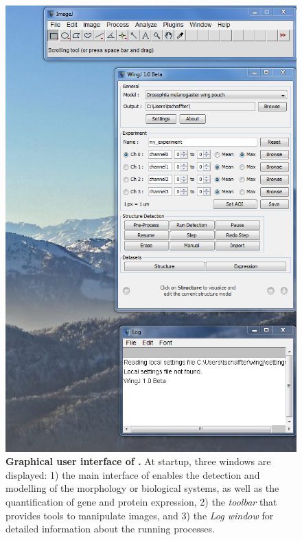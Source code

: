 \begin{figure}[!h]
\centering
\includegraphics[scale=0.5]{images/wingj_interface_crop4.jpg}
\caption{\textbf{Graphical user interface of \wingj.} At startup, three windows are displayed: 1) the main interface of \wingj enables the detection and modelling of the morphology or biological systems, as well as the quantification of gene and protein expression, 2) the \textit{\ij toolbar} that provides tools to manipulate images, and 3) the \textit{Log window} for detailed information about the running processes.}
\label{fig:wingj_interface}
\end{figure}




